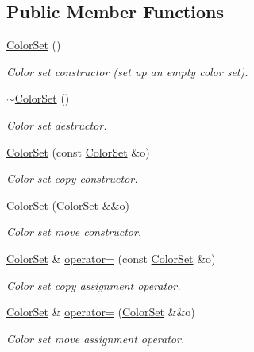 \subsection*{Public Member Functions}
\begin{DoxyCompactItemize}
\item 
\hyperlink{classColorSet_a68ce91b51db079f9810e57ebc8067ba8}{Color\+Set} ()
\begin{DoxyCompactList}\small\item\em Color set constructor (set up an empty color set). \end{DoxyCompactList}\item 
\mbox{\label{classColorSet_ade46d97a4de22b854354257b07eedbb0}} 
\hyperlink{classColorSet_ade46d97a4de22b854354257b07eedbb0}{$\sim$\+Color\+Set} ()
\begin{DoxyCompactList}\small\item\em Color set destructor. \end{DoxyCompactList}\item 
\hyperlink{classColorSet_ae5b1a35d8a19794a4d1abe7bad8b3b7b}{Color\+Set} (const \hyperlink{classColorSet}{Color\+Set} \&o)
\begin{DoxyCompactList}\small\item\em Color set copy constructor. \end{DoxyCompactList}\item 
\hyperlink{classColorSet_ae449ca6e75962c644c2c38fc4687cee8}{Color\+Set} (\hyperlink{classColorSet}{Color\+Set} \&\&o)
\begin{DoxyCompactList}\small\item\em Color set move constructor. \end{DoxyCompactList}\item 
\hyperlink{classColorSet}{Color\+Set} \& \hyperlink{classColorSet_ab90fee025c639c2950632f995c0eac0a}{operator=} (const \hyperlink{classColorSet}{Color\+Set} \&o)
\begin{DoxyCompactList}\small\item\em Color set copy assignment operator. \end{DoxyCompactList}\item 
\hyperlink{classColorSet}{Color\+Set} \& \hyperlink{classColorSet_a9196bc31bdb43e0df980d294458b7c29}{operator=} (\hyperlink{classColorSet}{Color\+Set} \&\&o)
\begin{DoxyCompactList}\small\item\em Color set move assignment operator. \end{DoxyCompactList}\item 

\end{DoxyCompactItemize}
